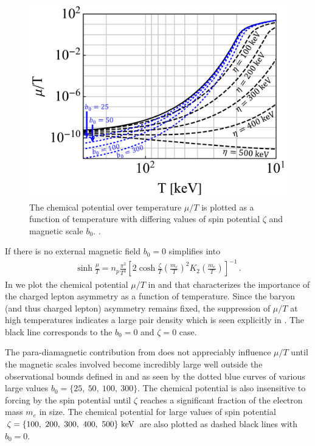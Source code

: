 \begin{figure}[ht]
 \centering
 \includegraphics[clip, trim=0.0cm 0.0cm 0.0cm 0.0cm,width=0.95\linewidth]{plots/thesis_chempot_fixed.pdf}
 \caption{The chemical potential over temperature $\mu/T$ is plotted as a function of temperature with differing values of spin potential $\zeta$ and magnetic scale $b_{0}$. . }
 \label{fig:chemicalpotential}
\end{figure}

If there is no external magnetic field $b_{0}=0$  simplifies into
\begin{align}
 \label{simpchem:1}
 \sinh\frac{\mu}{T}=n_{p}\frac{\pi^{2}}{T^{3}}\left[2\cosh\frac{\zeta}{T}\left(\frac{m_{e}}{T}\right)^{2}K_{2}\left(\frac{m_{e}}{T}\right)\right]^{-1}\,.
\end{align}
In  we plot the chemical potential $\mu/T$ in  and  that characterizes the importance of the charged lepton asymmetry as a function of temperature. Since the baryon (and thus charged lepton) asymmetry remains fixed, the suppression of $\mu/T$ at high temperatures indicates a large pair density which is seen explicitly in . The black line corresponds to the $b_{0}=0$ and $\zeta=0$ case. 

The para-diamagnetic contribution from  does not appreciably influence $\mu/T$ until the magnetic scales involved become incredibly large well outside the observational bounds defined in  and  as seen by the dotted blue curves of various large values $b_{0}=\{25,\ 50,\ 100,\ 300\}$. The chemical potential is also insensitive to forcing by the spin potential until $\zeta$ reaches a significant fraction of the electron mass $m_{e}$ in size. The chemical potential for large values of spin potential $\zeta=\{100,\ 200,\ 300,\ 400,\ 500\}\,\text{\,keV}$ are also plotted as dashed black lines with $b_{0}=0$.

